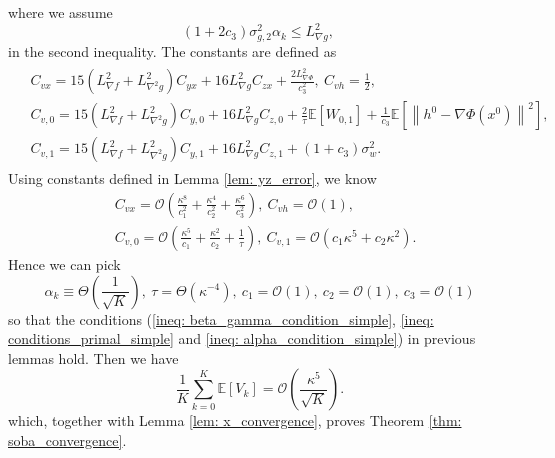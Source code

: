 \documentclass[10pt]{article}
\theoremstyle{remark}
\newcommand{\cO}{\mathcal{O}}
\newcommand{\E}{\mathbb{E}}
\newcommand{\norm}[1]{\left\|#1\right\|}
\begin{document}
where we assume
\begin{equation}\label{ineq: alpha_condition_simple}
    (1 + 2c_3)\sigma_{g,2}^2\alpha_k\leq L_{\nabla g}^2,\ 
\end{equation}
in the second inequality. The constants are defined as
\begin{align}
    \begin{aligned}
        &C_{vx} = 15\left(L_{\nabla f}^2 + L_{\nabla^2 g}^2\right)C_{yx} + 16L_{\nabla g}^2C_{zx} + \frac{2L_{\nabla \Phi}^2}{c_3^2} ,\ C_{vh} = \frac{1}{2}, \\
        &C_{v,0} = 15\left(L_{\nabla f}^2 + L_{\nabla^2 g}^2\right)C_{y,0} + 16L_{\nabla g}^2C_{z,0} + \frac{2}{\tau}\E\left[W_{0,1}\right] + \frac{1}{c_3}\E\left[\norm{h^0 - \nabla\Phi(x^0)}^2\right],\\
        &C_{v,1} = 15\left(L_{\nabla f}^2 + L_{\nabla^2 g}^2\right)C_{y,1} + 16L_{\nabla g}^2C_{z,1} + (1+c_3)\sigma_w^2.
    \end{aligned}
\end{align}
Using constants defined in Lemma \ref{lem: yz_error}, we know
\begin{align*}
    &C_{vx}= \cO\left(\frac{\kappa^8}{c_1^2} + \frac{\kappa^4}{c_2^2} + \frac{\kappa^6}{c_3^2}\right),\ C_{vh} = \cO(1),\\
    &C_{v,0} = \cO\left(\frac{\kappa^5}{c_1} + \frac{\kappa^2}{c_2} + \frac{1}{\tau}\right),\ C_{v,1} = \cO\left(c_1\kappa^5 + c_2\kappa^2\right).
\end{align*}
Hence we can pick 
\[
    \alpha_k \equiv \Theta\left(\frac{1}{\sqrt{K}}\right),\ \tau = \Theta\left(\kappa^{-4}\right),\ c_1 = \cO(1),\ c_2 = \cO(1),\ c_3 = \cO(1)
\]
so that the conditions (\eqref{ineq: beta_gamma_condition_simple}, \eqref{ineq: conditions_primal_simple} and \eqref{ineq: alpha_condition_simple}) in previous lemmas hold. Then we have
\[
    \frac{1}{K}\sum_{k=0}^{K}\E\left[V_k\right] = \cO\left(\frac{\kappa^5}{\sqrt{K}}\right).
\]
which, together with Lemma \ref{lem: x_convergence}, proves Theorem \ref{thm: soba_convergence}.
\end{document}
